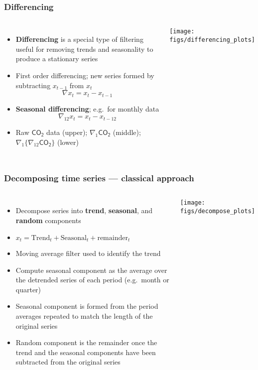 \documentclass{beamer}
\begin{document}
\begin{frame}
\frametitle{Differencing}
\begin{columns}
    \column{6cm}
    \begin{itemize}
        \item \textbf{Differencing} is a special type of filtering useful for removing trends and seasonality to produce a stationary series
        \item First order differencing; new series formed by subtracting $x_{t-1}$ from $x_t$
        $$\nabla x_t = x_t - x_{t-1}$$
        \item \textbf{Seasonal differencing}; e.g.~for monthly data
        $$\nabla_{12} x_t = x_t - x_{t-12}$$
        \item Raw $\mathsf{CO_2}$ data (upper); $\nabla_1 \mathsf{CO_2}$ (middle); $\nabla_1\{\nabla_{12} \mathsf{CO_2}\}$ (lower)
    \end{itemize}
    \column{6cm}
    \texttt{[image: figs/differencing\_plots]}
\end{columns}
\end{frame}

\begin{frame}
\frametitle{Decomposing time series --- classical approach}
\begin{columns}
    \column{7cm}
    \begin{itemize}
        \item Decompose series into \textbf{trend}, \textbf{seasonal}, and \textbf{random} components
        \item $x_t = \mathrm{Trend}_t + \mathrm{Seasonal}_t + \mathrm{remainder}_t$
        \item Moving average filter used to identify the trend
        \item Compute seasonal component as the average over the detrended series of each period (e.g.~month or quarter)
        \item Seasonal component is formed from the period averages repeated to match the length of the original series
        \item Random component is the remainder once the trend and the seasonal components have been subtracted from the original series
    \end{itemize}
    \column{5cm}
    \texttt{[image: figs/decompose\_plots]}
\end{columns}
\normalsize
\end{frame}
\end{document}
